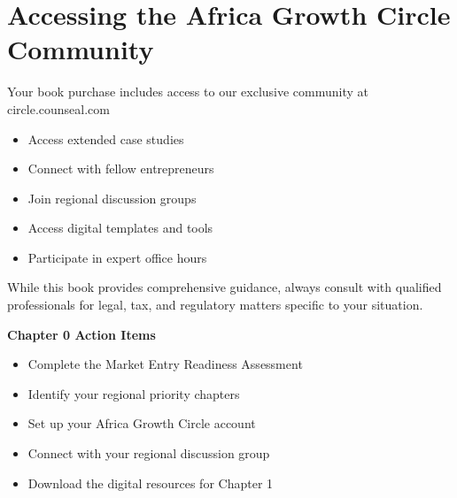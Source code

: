 \section{Accessing the Africa Growth Circle Community}

\begin{communitybox}
Your book purchase includes access to our exclusive community at circle.counseal.com
\begin{itemize}
    \item Access extended case studies
    \item Connect with fellow entrepreneurs
    \item Join regional discussion groups
    \item Access digital templates and tools
    \item Participate in expert office hours
\end{itemize}
\end{communitybox}

\begin{warningbox}
While this book provides comprehensive guidance, always consult with qualified professionals for legal, tax, and regulatory matters specific to your situation.
\end{warningbox}

\begin{workshopbox}
\textbf{Chapter 0 Action Items}
\begin{itemize}
    \item Complete the Market Entry Readiness Assessment
    \item Identify your regional priority chapters
    \item Set up your Africa Growth Circle account
    \item Connect with your regional discussion group
    \item Download the digital resources for Chapter 1
\end{itemize}
\end{workshopbox}
